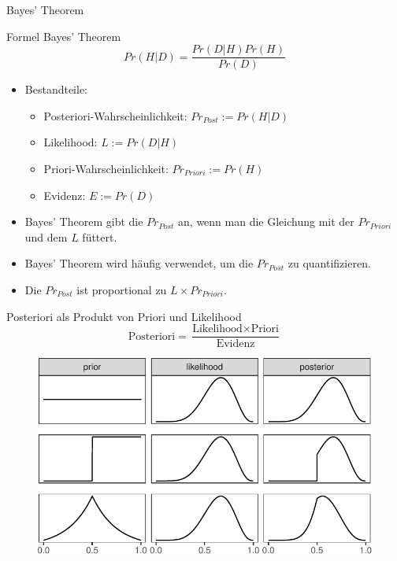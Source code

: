 \documentclass[
  ngerman,
  ignorenonframetext,
]{beamer}
\begin{document}
\begin{frame}{Bayes' Theorem}
\protect\hypertarget{bayes-theorem}{}
\begin{alertblock}{Formel Bayes' Theorem}
$$Pr(H|D) = \frac{Pr(D|H) Pr(H)}{Pr(D)}$$
\end{alertblock}

\begin{itemize}
\item
  Bestandteile:

  \begin{itemize}
  \item
    Posteriori-Wahrscheinlichkeit: \(Pr_{Post} := Pr(H|D)\)
  \item
    Likelihood: \(L := Pr(D|H)\)
  \item
    Priori-Wahrscheinlichkeit: \(Pr_{Priori} := Pr(H)\)
  \item
    Evidenz: \(E := Pr(D)\)
  \end{itemize}
\item
  Bayes' Theorem gibt die \(Pr_{Post}\) an, wenn man die Gleichung mit
  der \(Pr_{Priori}\) und dem \(L\) füttert.
\item
  Bayes' Theorem wird häufig verwendet, um die \(Pr_{Post}\) zu
  quantifizieren.
\item
  Die \(Pr_{Post}\) ist proportional zu \(L \times Pr_{Priori}\).
\end{itemize}
\end{frame}

\begin{frame}{Posteriori als Produkt von Priori und Likelihood}
\protect\hypertarget{posteriori-als-produkt-von-priori-und-likelihood}{}
\[\text{Posteriori} = \frac{\text{Likelihood} \times \text{Priori}}{\text{Evidenz}}\]

\begin{figure}[H]
\includegraphics[width=0.7\linewidth]{unnamed-chunk-27-1} \end{figure}
\end{frame}
\end{document}
